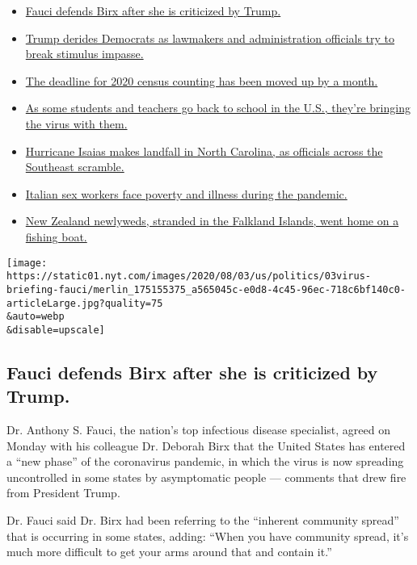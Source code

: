 \begin{itemize}
\tightlist
\item
  \protect\hyperlink{link-4547638f}{Fauci defends Birx after she is
  criticized by Trump.}
\item
  \protect\hyperlink{link-15e7f995}{Trump derides Democrats as lawmakers
  and administration officials try to break stimulus impasse.}
\item
  \protect\hyperlink{link-e5a2cda}{The deadline for 2020 census counting
  has been moved up by a month.}
\item
  \protect\hyperlink{link-4c85ed64}{As some students and teachers go
  back to school in the U.S., they're bringing the virus with them.}
\item
  \protect\hyperlink{link-5ccc012}{Hurricane Isaias makes landfall in
  North Carolina, as officials across the Southeast scramble.}
\item
  \protect\hyperlink{link-6bfd36ea}{Italian sex workers face poverty and
  illness during the pandemic.}
\item
  \protect\hyperlink{link-bfeb498}{New Zealand newlyweds, stranded in
  the Falkland Islands, went home on a fishing boat.}
\end{itemize}

\texttt{[image: https://static01.nyt.com/images/2020/08/03/us/politics/03virus-briefing-fauci/merlin\_175155375\_a565045c-e0d8-4c45-96ec-718c6bf140c0-articleLarge.jpg?quality=75\\\&auto=webp\\\&disable=upscale]}

\hypertarget{fauci-defends-birx-after-she-is-criticized-by-trump}{%
\subsection{Fauci defends Birx after she is criticized by
Trump.}\label{fauci-defends-birx-after-she-is-criticized-by-trump}}

Dr. Anthony S. Fauci, the nation's top infectious disease specialist,
agreed on Monday with his colleague Dr. Deborah Birx that the United
States has entered a ``new phase'' of the coronavirus pandemic, in which
the virus is now spreading uncontrolled in some states by asymptomatic
people --- comments that drew fire from President Trump.

Dr. Fauci said Dr. Birx had been referring to the ``inherent community
spread'' that is occurring in some states, adding: ``When you have
community spread, it's much more difficult to get your arms around that
and contain it.''

